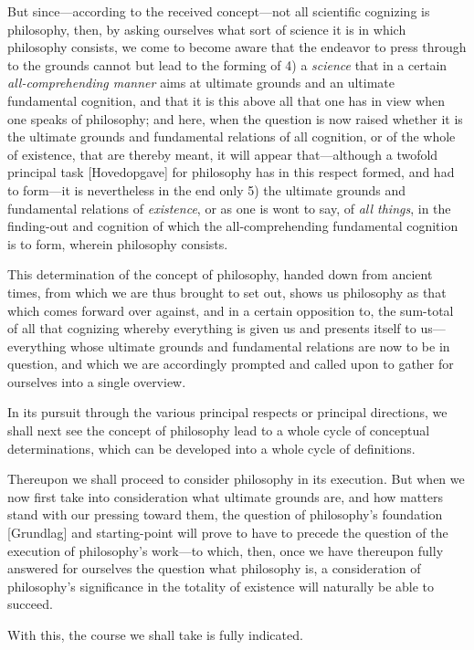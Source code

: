 \documentclass[12pt,a4paper]{book}
\begin{document}
But since---according to the received concept---not all scientific cognizing is
philosophy, then, by asking ourselves what sort of science it is in which
philosophy consists, we come to become aware that the endeavor to press through
to the grounds cannot but lead to the forming of 4) a \emph{science} that in a
certain \emph{all-comprehending manner} aims at ultimate grounds and an ultimate
fundamental cognition, and that it is this above all that one has in view when
one speaks of philosophy; and here, when the question is now raised whether it is
the ultimate grounds and fundamental relations of all cognition, or of the whole
of existence, that are thereby meant, it will appear that---although a twofold
principal task [Hovedopgave] for philosophy has in this respect formed, and had
to form---it is nevertheless in the end only 5) the ultimate grounds and
fundamental relations of \emph{existence}, or as one is wont to say, of \emph{all
things}, in the finding-out and cognition of which the all-comprehending
fundamental cognition is to form, wherein philosophy consists.

This determination of the concept of philosophy, handed down from ancient times,
from which we are thus brought to set out, shows us philosophy as that which
comes forward over against, and in a certain opposition to, the sum-total of all
that cognizing whereby everything is given us and presents itself to us---%
everything whose ultimate grounds and fundamental relations are now to be in
question, and which we are accordingly prompted and called upon to gather for
ourselves into a single overview.

In its pursuit through the various principal respects or principal directions, we
shall next see the concept of philosophy lead to a whole cycle of conceptual
determinations, which can be developed into a whole cycle of definitions.

Thereupon we shall proceed to consider philosophy in its execution. But when we
now first take into consideration what ultimate grounds are, and how matters
stand with our pressing toward them, the question of philosophy's foundation
[Grundlag] and starting-point will prove to have to precede the question of the
execution of philosophy's work---to which, then, once we have thereupon fully
answered for ourselves the question what philosophy is, a consideration of
philosophy's significance in the totality of existence will naturally be able to
succeed.

With this, the course we shall take is fully indicated.
\end{document}
